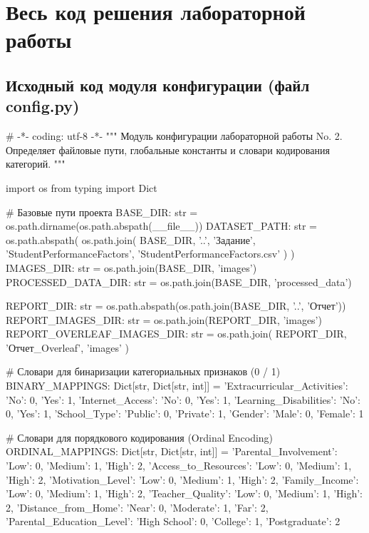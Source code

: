 \documentclass[14pt,a4paper]{extarticle}
\begin{document}
\clearpage
\section{Весь код решения лабораторной работы}

\subsection{Исходный код модуля конфигурации (файл config.py)}
\begin{CodeListing}
# -*- coding: utf-8 -*-
"""
Модуль конфигурации лабораторной работы No.  2.
Определяет файловые пути, глобальные константы и словари кодирования категорий.
"""

import os
from typing import Dict

# Базовые пути проекта
BASE_DIR: str = os.path.dirname(os.path.abspath(__file__))
DATASET_PATH: str = os.path.abspath(
    os.path.join(
        BASE_DIR, '..', 'Задание', 'StudentPerformanceFactors',
        'StudentPerformanceFactors.csv'
    )
)
IMAGES_DIR: str = os.path.join(BASE_DIR, 'images')
PROCESSED_DATA_DIR: str = os.path.join(BASE_DIR, 'processed_data')

REPORT_DIR: str = os.path.abspath(os.path.join(BASE_DIR, '..', 'Отчет'))
REPORT_IMAGES_DIR: str = os.path.join(REPORT_DIR, 'images')
REPORT_OVERLEAF_IMAGES_DIR: str = os.path.join(
    REPORT_DIR, 'Отчет_Overleaf', 'images'
)

# Словари для бинаризации категориальных признаков (0 / 1)
BINARY_MAPPINGS: Dict[str, Dict[str, int]] = {
    'Extracurricular_Activities': {'No': 0, 'Yes': 1},
    'Internet_Access': {'No': 0, 'Yes': 1},
    'Learning_Disabilities': {'No': 0, 'Yes': 1},
    'School_Type': {'Public': 0, 'Private': 1},
    'Gender': {'Male': 0, 'Female': 1}
}

# Словари для порядкового кодирования (Ordinal Encoding)
ORDINAL_MAPPINGS: Dict[str, Dict[str, int]] = {
    'Parental_Involvement': {'Low': 0, 'Medium': 1, 'High': 2},
    'Access_to_Resources': {'Low': 0, 'Medium': 1, 'High': 2},
    'Motivation_Level': {'Low': 0, 'Medium': 1, 'High': 2},
    'Family_Income': {'Low': 0, 'Medium': 1, 'High': 2},
    'Teacher_Quality': {'Low': 0, 'Medium': 1, 'High': 2},
    'Distance_from_Home': {'Near': 0, 'Moderate': 1, 'Far': 2},
    'Parental_Education_Level': {
        'High School': 0,
        'College': 1,
        'Postgraduate': 2
    }
}


\end{CodeListing}
\end{document}
